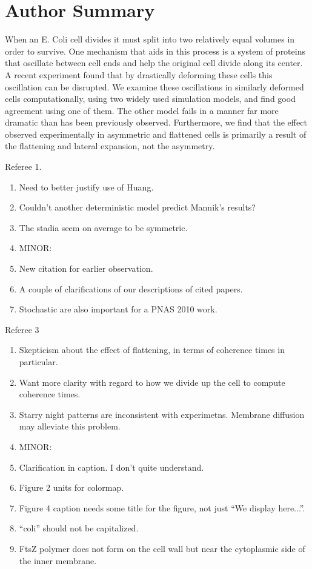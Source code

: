 \documentclass[10pt,letterpaper]{article}
\begin{document}
\section*{Author Summary}
  When an E. Coli cell divides it must split into two relatively equal
  volumes in order to survive.  One mechanism that aids in this
  process is a system of proteins that oscillate between cell ends and
  help the original cell divide along its center.  A recent experiment
  found that by drastically deforming these cells this oscillation can
  be disrupted.  We examine these oscillations in similarly deformed
  cells computationally, using two widely used simulation models, and
  find good agreement using one of them.  The other model fails in a
  manner far more dramatic than has been previously observed.
  Furthermore, we find that the effect observed experimentally in
  asymmetric and flattened cells is primarily a result of the
  flattening and lateral expansion, not the asymmetry.

\linenumbers

{
  \color{red}
  Referee 1.
  \begin{enumerate}
  \item Need to better justify use of Huang.
  \item Couldn't another deterministic model predict Mannik's results?
  \item The stadia seem on average to be symmetric.
  \item MINOR:
  \item New citation for earlier observation.
  \item A couple of clarifications of our descriptions of cited papers.
  \item Stochastic are also important for a PNAS 2010 work.
  \end{enumerate}

  Referee 3
  \begin{enumerate}
  \item Skepticism about the effect of flattening, in terms of
    coherence times in particular.
  \item Want more clarity with regard to how we divide up the cell to
    compute coherence times.
  \item Starry night patterns are inconsistent with experimetns.
    Membrane diffusion may alleviate this problem.
  \item MINOR:
  \item Clarification in caption.  I don't quite understand.
  \item Figure 2 units for colormap.
  \item Figure 4 caption needs some title for the figure, not just
    ``We display here...''.
  \item ``coli'' should not be capitalized.
  \item FtsZ polymer does not form on the cell wall but near the
    cytoplasmic side of the inner membrane.
  \end{enumerate}
}
\end{document}
